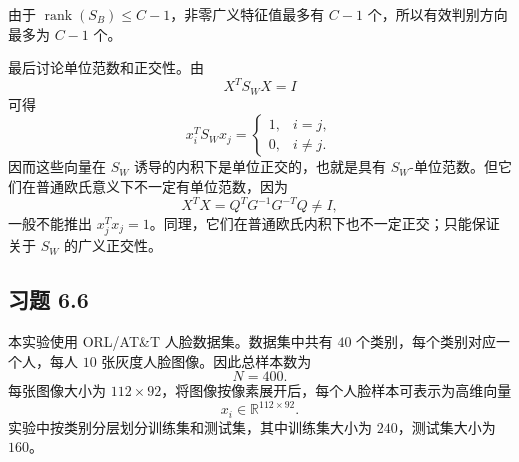 \documentclass[UTF8,a4paper,12pt]{ctexart}
\begin{document}
\begin{enumerate}
  由于 $\operatorname{rank}(S_B)\le C-1$，非零广义特征值最多有 $C-1$ 个，所以有效判别方向最多为 $C-1$ 个。

  最后讨论单位范数和正交性。由
  \[
      X^TS_WX=I
  \]
  可得
  \[
      x_i^TS_Wx_j=
      \begin{cases}
      1,& i=j,\\
      0,& i\ne j.
      \end{cases}
  \]
  因而这些向量在 $S_W$ 诱导的内积下是单位正交的，也就是具有 $S_W$-单位范数。但它们在普通欧氏意义下不一定有单位范数，因为
  \[
      X^TX=Q^TG^{-1}G^{-T}Q\ne I,
  \]
  一般不能推出 $x_j^Tx_j=1$。同理，它们在普通欧氏内积下也不一定正交；只能保证关于 $S_W$ 的广义正交性。
\end{enumerate}

\subsection*{习题 6.6}

本实验使用 ORL/AT\&T 人脸数据集。数据集中共有 $40$ 个类别，每个类别对应一个人，每人 $10$ 张灰度人脸图像。因此总样本数为
\[
    N=400.
\]
每张图像大小为 $112\times92$，将图像按像素展开后，每个人脸样本可表示为高维向量
\[
    x_i\in\mathbb{R}^{112\times92}.
\]
实验中按类别分层划分训练集和测试集，其中训练集大小为 $240$，测试集大小为 $160$。
\end{document}
